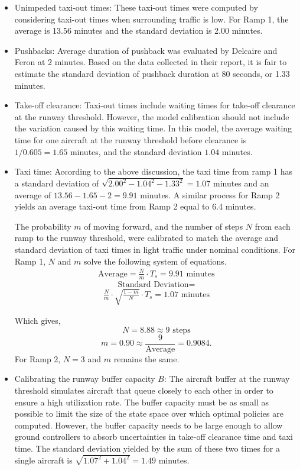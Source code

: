 \documentclass[letterpaper]{article}
\begin{document}
\fi
\begin{itemize}
\item Unimpeded taxi-out times: These taxi-out times were computed by considering taxi-out times when surrounding traffic is low. For Ramp 1, the average is 13.56 minutes and the standard deviation is 2.00 minutes.

\item Pushbacks:
Average duration of pushback was evaluated by Delcaire and Feron \cite{Delcaire1997} at 2 minutes. Based on the data collected in their report, it is fair to estimate the standard deviation of pushback duration at 80 seconds, or 1.33 minutes.

\item Take-off clearance:
Taxi-out times include waiting times for take-off clearance at the runway threshold. However, the 
model calibration should not include the variation caused by this waiting time. In this model, the average waiting time for one aircraft at the runway threshold before clearance is $1/0.605 = 1.65$ minutes, and the standard deviation $1.04$ minutes.

\item Taxi time:
According to the above discussion, the taxi time from ramp 1 has a standard deviation of $\sqrt{2.00^{2}-1.04^{2}-1.33^2}=1.07$ minutes 
and an average of $13.56-1.65-2 = 9.91$ minutes. A similar process for Ramp 2 yields an average taxi-out time from Ramp 2 equal to 6.4 minutes.

The probability $m$  of moving forward, and the number of steps $N$ from each ramp to the runway threshold, were calibrated to match the average and standard deviation of taxi times in light traffic under nominal conditions. For Ramp 1, $N$ and $m$ solve the following system of equations.
\begin{eqnarray}
\mbox{Average} = \frac{N}{m}\cdot T_s  = 9.91 \mbox{ minutes}
\end{eqnarray}
$$ \mbox{Standard Deviation} = $$
 \begin{eqnarray}
\frac{N}{m}\cdot \sqrt{\frac{1-m}{N}} \cdot T_s  = 1.07 \mbox{ minutes}
  \end{eqnarray}

Which gives,
$$N = 8.88 \approx 9 \mbox{ steps}$$
 $$m = 0.90 \approx \frac{9}{\mbox{Average}} = 0.9084.$$
For Ramp 2, $N=3$ and $m$ remains the same.
\item Calibrating the runway buffer capacity $B$:
The aircraft buffer  at the runway threshold simulates aircraft that queue closely to each other in order to ensure a high utilization rate. 
The buffer capacity must be as small as possible to limit the size of the state space over which optimal policies are computed.
However, the buffer capacity needs to be large enough to allow ground controllers to absorb uncertainties in take-off clearance time and taxi time. 
The standard deviation yielded by the sum of these two times for a single aircraft is $\sqrt{1.07^{2}+1.04^{2}}=1.49$ minutes.


\end{itemize}
\end{document}
